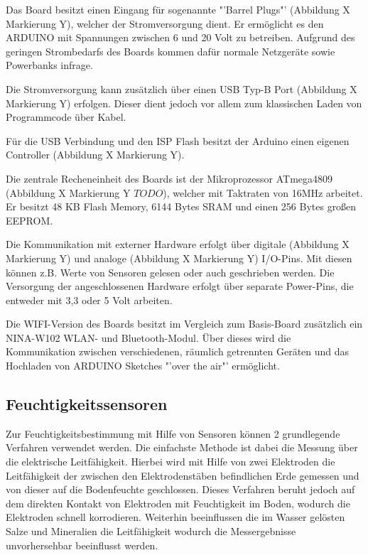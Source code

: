 \documentclass[
    load-dhbw-templates,
    load-preamble = true,
    auto-intro-pages = all,
    add-tocs-to-toc,
    debug = true,
    language = english,
    mainlanguage = ngerman,
    add-bibliography,
    bib-file = dhbw-source.bib,
    biblatex/style = numeric,
    print- = false
]{iodhbwm}
\begin{document}

        Das Board besitzt einen Eingang für sogenannte "'Barrel Plugs"' (Abbildung X Markierung Y), welcher der Stromversorgung dient. Er ermöglicht es den ARDUINO mit Spannungen zwischen 6 und 20 Volt zu betreiben. Aufgrund des geringen Strombedarfs des Boards kommen dafür normale Netzgeräte sowie Powerbanks infrage.
        
        Die Stromversorgung kann zusätzlich über einen USB Typ-B Port (Abbildung X Markierung Y) erfolgen. Dieser dient jedoch vor allem zum klassischen Laden von Programmcode über Kabel. 

        Für die USB Verbindung und den ISP Flash besitzt der Arduino einen eigenen Controller (Abbildung X Markierung Y).

        Die zentrale Recheneinheit des Boards ist der Mikroprozessor ATmega4809 (Abbildung X Markierung Y $TODO$), welcher mit Taktraten von 16MHz arbeitet. Er besitzt 48 KB Flash Memory, 6144 Bytes SRAM und einen 256 Bytes großen EEPROM. %

        Die Kommunikation mit externer Hardware erfolgt über digitale (Abbildung X Markierung Y) und analoge (Abbildung X Markierung Y) I/O-Pins. Mit diesen können z.B. Werte von Sensoren gelesen oder auch geschrieben werden.
        Die Versorgung der angeschlossenen Hardware erfolgt über separate Power-Pins, die entweder mit 3,3 oder 5 Volt arbeiten.
        
        Die WIFI-Version des Boards besitzt im Vergleich zum Basis-Board zusätzlich ein NINA-W102 WLAN- und Bluetooth-Modul. Über dieses wird die Kommunikation zwischen verschiedenen, räumlich getrennten Geräten und das Hochladen von ARDUINO Sketches "'over the air"' ermöglicht.

        \subsection{Feuchtigkeitssensoren}

        Zur Feuchtigkeitsbestimmung mit Hilfe von Sensoren können 2 grundlegende Verfahren verwendet werden. Die einfachste Methode ist dabei die Messung über die elektrische Leitfähigkeit. Hierbei wird mit Hilfe von zwei Elektroden die Leitfähigkeit der zwischen den Elektrodenstäben befindlichen Erde gemessen und von dieser auf die Bodenfeuchte geschlossen. Dieses Verfahren beruht jedoch auf dem direkten Kontakt von Elektroden mit Feuchtigkeit im Boden, wodurch die Elektroden schnell korrodieren. Weiterhin beeinflussen die im Wasser gelösten Salze und Mineralien die Leitfähigkeit wodurch die Messergebnisse unvorhersehbar beeinflusst werden. %
\end{document}
